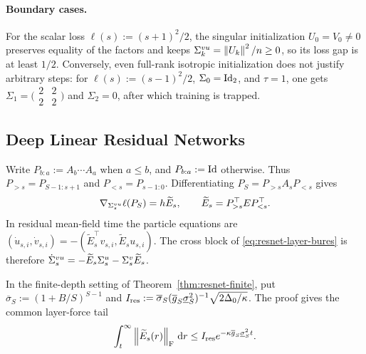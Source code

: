 \paragraph{Boundary cases.}
For the scalar loss $\ell(s):=(s+1)^2/2$, the singular initialization
$U_0=V_0\ne0$ preserves equality of the factors and keeps
$\Sigma^{vu}_k=\left\lVert U_k \right\rVert^2/n\ge0$, so its loss gap is at least $1/2$.
Conversely, even full-rank isotropic initialization does not justify arbitrary steps:
for $\ell(s):=(s-1)^2/2$, $\Sigma_0=\mathrm{Id}_2$, and $\tau=1$, one gets
$\Sigma_1=\bigl(\begin{smallmatrix}2&2\\2&2\end{smallmatrix}\bigr)$
and $\Sigma_2=0$, after which training is trapped.

\subsection{Deep Linear Residual Networks}\label{app:resnets}
Write
$P_{b:a}:=A_b\cdots A_a$ when $a\le b$, and $P_{b:a}:=\mathrm{Id}$ otherwise.
Thus $P_{>s}=P_{S-1:s+1}$ and $P_{<s}=P_{s-1:0}$.
Differentiating $P_S=P_{>s}A_sP_{<s}$ gives
\begin{equation}
  \label{eq:resnet-layer-gradient}
\nabla_{\Sigma^{vu}_s}\ell(P_S)
=h\widetilde E_s,
\qquad
\widetilde E_s=P_{>s}^\top E P_{<s}^\top.
\end{equation}
In residual mean-field time the particle equations are
$(\dot u_{s,i},\dot v_{s,i})
=-(\widetilde E_s^\top v_{s,i},\widetilde E_su_{s,i})$.
The cross block of \eqref{eq:resnet-layer-bures} is therefore
$\dot{\Sigma}^{vu}_s=-\widetilde E_s\Sigma^u_s-\Sigma^v_s\widetilde E_s$.

In the finite-depth setting of Theorem~\ref{thm:resnet-finite}, put
$\overline{\sigma}_S:=(1+B/S)^{S-1}$ and
$I_{\rm res}:=\overline{\sigma}_S(\overline g_S\underline{\sigma}_S^2)^{-1}\sqrt{2\Delta_0/\kappa}$.
The proof gives the common layer-force tail
\begin{equation}\label{eq:resnet-length}
 \int_t^\infty\left\lVert \widetilde E_s(r) \right\rVert_{\mathrm{F}}\,\mathrm{d} r
 \le I_{\rm res}e^{-\kappa\overline g_S\underline{\sigma}_S^2t}.
\end{equation}

